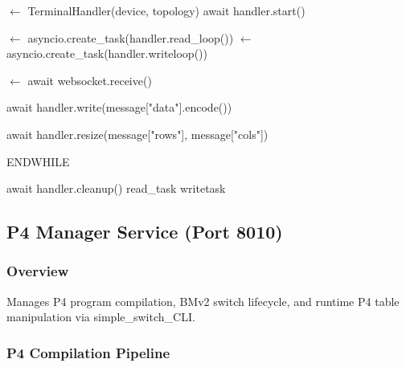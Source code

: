 \documentclass[10pt,a4paper]{article}
\begin{document}
\begin{algorithm}
\caption{WebSocket Terminal I/O Loop}
\begin{algorithmic}[H]
 $\leftarrow$ TerminalHandler(device, topology)
await handler.start()

 $\leftarrow$ asyncio.create\_task(handler.read\_loop())
 $\leftarrow$ asyncio.create\_task(handler.writeloop())

 \DO
     $\leftarrow$ await websocket.receive()

     \THEN
        await handler.write(message["data"].encode())

     \THEN
        await handler.resize(message["rows"], message["cols"])

     \THEN
        \BREAK
    \ENDIF
ENDWHILE

await handler.cleanup()
\CANCEL read\_task
\CANCEL writetask
\end{algorithmic}
\end{algorithm}

\subsection{P4 Manager Service (Port 8010)}

\subsubsection{Overview}
Manages P4 program compilation, BMv2 switch lifecycle, and runtime P4 table manipulation via simple\_switch\_CLI.

\subsubsection{P4 Compilation Pipeline}
\end{document}
